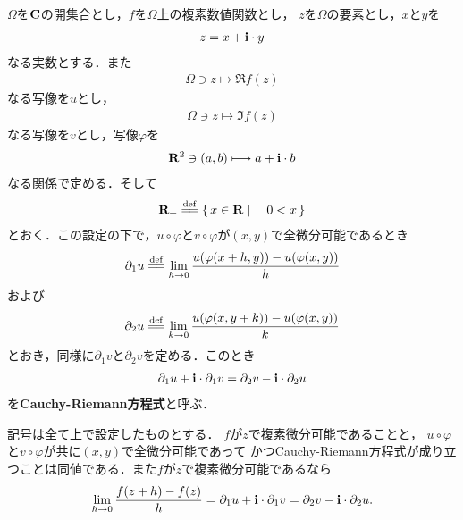 	$\Omega$を$\mathbf{C}$の開集合とし，$f$を$\Omega$上の複素数値関数とし，
	$z$を$\Omega$の要素とし，$x$と$y$を
	\begin{align}
		z = x + \mathbf{i} \cdot y
	\end{align}
	なる実数とする．また
	\begin{align}
		\Omega \ni z \longmapsto \Re{f(z)}
	\end{align}
	なる写像を$u$とし，
	\begin{align}
		\Omega \ni z \longmapsto \Im{f(z)}
	\end{align}
	なる写像を$v$とし，写像$\varphi$を
	\begin{align}
		\mathbf{R}^2 \ni (a,b) \longmapsto a + \mathbf{i} \cdot b
	\end{align}
	なる関係で定める．そして
	\begin{align}
		\R_+ \defeq \Set{x \in \R}{0 < x}
	\end{align}
	とおく．この設定の下で，$u \circ \varphi$と$v \circ \varphi$が$(x,y)$で全微分可能であるとき
	\begin{align}
		\partial_1 u \defeq \lim_{h \to 0} \frac{u(\varphi(x+h,y)) - u(\varphi(x,y))}{h}
	\end{align}
	および
	\begin{align}
		\partial_2 u \defeq \lim_{k \to 0} \frac{u(\varphi(x,y+k)) - u(\varphi(x,y))}{k}
	\end{align}
	とおき，同様に$\partial_1 v$と$\partial_2 v$を定める．このとき
	\begin{align}
		\partial_1 u + \mathbf{i} \cdot \partial_1 v = \partial_2 v - \mathbf{i} \cdot \partial_2 u
	\end{align}
	を{\bf Cauchy-Riemann方程式}と呼ぶ．
	
	\begin{screen}
		\begin{thm}
			記号は全て上で設定したものとする．
			$f$が$z$で複素微分可能であることと，
			$u \circ \varphi$と$v \circ \varphi$が共に$(x,y)$で全微分可能であって
			かつCauchy-Riemann方程式が成り立つことは同値である．また$f$が$z$で複素微分可能であるなら
			\begin{align}
				\lim_{h \to 0} \frac{f(z+h) - f(z)}{h}
				= \partial_1 u + \mathbf{i} \cdot \partial_1 v
				= \partial_2 v - \mathbf{i} \cdot \partial_2 u.
			\end{align}
		\end{thm}
	\end{screen}
	
